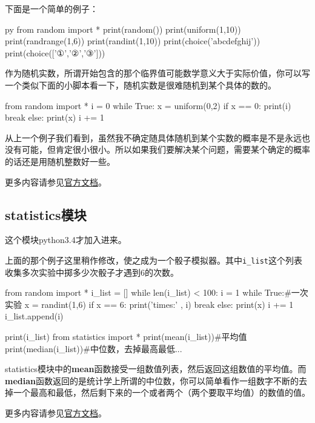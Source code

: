 \documentclass[12pt,oneside]{book}
\begin{document}
\begin{common-format}
下面是一个简单的例子：
\begin{xverbatim}[129]{py}
from random import *
print(random())
print(uniform(1,10))
print(randrange(1,6))
print(randint(1,10))
print(choice('abcdefghij'))
print(choice(['①','②','③']))
\end{xverbatim}


作为随机实数，所谓开始包含的那个临界值可能数学意义大于实际价值，你可以写一个类似下面的小脚本看一下，随机实数是很难随机到某个具体的数的。
\begin{tcbpython}[]
from random import *
i = 0
while True:
    x = uniform(0,2)
    if x == 0:
        print(i)
        break
    else:
        print(x)
        i += 1
\end{tcbpython}

从上一个例子我们看到，虽然我不确定随具体随机到某个实数的概率是不是永远也没有可能，但肯定很小很小。所以如果我们要解决某个问题，需要某个确定的概率的话还是用随机整数好一些。


\begin{large}
更多内容请参见\href{http://docs.python.org/3.4/library/random.html}{官方文档}。
\end{large}


\subsection{statistics模块}
这个模块python3.4才加入进来。

上面的那个例子这里稍作修改，使之成为一个骰子模拟器。其中\verb+i_list+这个列表收集多次实验中掷多少次骰子才遇到6的次数。
\begin{tcbpython}[]
from random import *
i_list = []
while len(i_list) < 100:
    i = 1
    while True:#一次实验
        x = randint(1,6)
        if x == 6:
            print('times:' , i)
            break
        else:
            print(x)
            i += 1
    i_list.append(i)

print(i_list)
from statistics import *
print(mean(i_list))#平均值
print(median(i_list))#中位数，去掉最高最低...
\end{tcbpython}

statistics模块中的\textbf{mean}函数接受一组数值列表，然后返回这组数值的平均值。而\textbf{median}函数返回的是统计学上所谓的中位数，你可以简单看作一组数字不断的去掉一个最高和最低，然后剩下来的一个或者两个（两个要取平均值）的数值的值。


\begin{large}
更多内容请参见\href{https://docs.python.org/3/library/statistics.html}{官方文档}。
\end{large}



\end{common-format}
\end{document}
